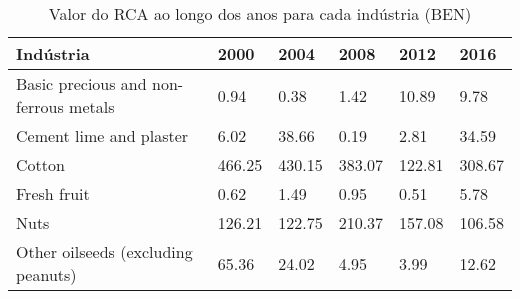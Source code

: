 \begin{table}
\centering
\caption{Valor do RCA ao longo dos anos para cada indústria (BEN)}
\label{tab:ex3-tempo-BEN}
\begin{tabular}{p{6cm}p{1.5cm}p{1.5cm}p{1.5cm}p{1.5cm}p{1.5cm}}
\toprule
                            Indústria &   2000 &   2004 &   2008 &   2012 &   2016 \\
\midrule
Basic precious and non-ferrous metals &   0.94 &   0.38 &   1.42 &  10.89 &   9.78 \\
              Cement lime and plaster &   6.02 &  38.66 &   0.19 &   2.81 &  34.59 \\
                               Cotton & 466.25 & 430.15 & 383.07 & 122.81 & 308.67 \\
                          Fresh fruit &   0.62 &   1.49 &   0.95 &   0.51 &   5.78 \\
                                 Nuts & 126.21 & 122.75 & 210.37 & 157.08 & 106.58 \\
   Other oilseeds (excluding peanuts) &  65.36 &  24.02 &   4.95 &   3.99 &  12.62 \\
\bottomrule
\end{tabular}
\end{table}
